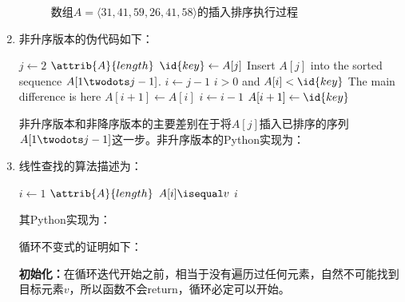 \documentclass[UTF8,a4paper,zihao=-4,oneside,onecolumn,scheme=chinese,autoindent=true]{ctexbook}
\begin{document}
\begin{enumerate}
{\begin{figure}[H]
              \caption{数组$A=\langle 31,41,59,26,41,58 \rangle$的插入排序执行过程}\label{练习221}
          \end{figure}
          }
    \item {
          非升序版本的伪代码如下：
          \begin{codebox}
              \li \For $j \gets 2$ \To $\attrib{A}{length}$
              \li \Do
              $\id{key} \gets A[j]$
              \li \Comment Insert $A[j]$ into the sorted sequence
              $A[1 \twodots j-1]$.
              \li $i \gets j-1$
              \li \While $i > 0$ and $A[i] < \id{key}$ \RComment The main difference is here
              \li \Do
              $A[i+1] \gets A[i]$
              \li $i \gets i-1$
              \End
              \li $A[i+1] \gets \id{key}$
              \End
          \end{codebox}

          非升序版本和非降序版本的主要差别在于将$A[j]$插入已排序的序列$A[1 \twodots j-1]$这一步。非升序版本的Python实现为：
          
          }
    \item {
          线性查找的算法描述为：
          \begin{codebox}
              \li \For $i \gets 1$ \To $\attrib{A}{length}$
              \li     \Do
              \If $A[i] \isequal v$
              \li         \Then \Return $i$
              \End
              \End
              \li \Return {}
          \end{codebox}

          其Python实现为：

          

          循环不变式的证明如下：

          \textbf{初始化：}在循环迭代开始之前，相当于没有遍历过任何元素，自然不可能找到目标元素$v$，所以函数不会return，循环必定可以开始。

}
\end{enumerate}
\end{document}
